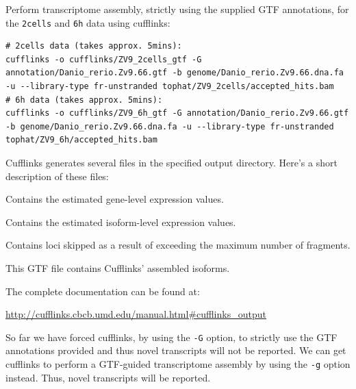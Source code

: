 \begin{steps}
Perform transcriptome assembly, strictly using the supplied GTF annotations, for the \texttt{2cells} and \texttt{6h} data using cufflinks:
\begin{lstlisting}
# 2cells data (takes approx. 5mins):
cufflinks -o cufflinks/ZV9_2cells_gtf -G annotation/Danio_rerio.Zv9.66.gtf -b genome/Danio_rerio.Zv9.66.dna.fa -u --library-type fr-unstranded tophat/ZV9_2cells/accepted_hits.bam
# 6h data (takes approx. 5mins):
cufflinks -o cufflinks/ZV9_6h_gtf -G annotation/Danio_rerio.Zv9.66.gtf -b genome/Danio_rerio.Zv9.66.dna.fa -u --library-type fr-unstranded tophat/ZV9_6h/accepted_hits.bam
\end{lstlisting}
\end{steps}

\begin{information}
Cufflinks generates several files in the specified output directory. Here's a short description of these files:

\begin{description}[style=multiline,labelindent=0cm,align=right,leftmargin=\descriptionlabelspace,rightmargin=1.5cm,font=\ttfamily]
\item[genes.fpkm\_tracking] Contains the estimated gene-level expression values.
\item[isoforms.fpkm\_tracking] Contains the estimated isoform-level expression values.
\item[skipped.gtf] Contains loci skipped as a result of exceeding the maximum number of fragments.
\item[transcripts.gtf] This GTF file contains Cufflinks' assembled isoforms.
\end{description}

The complete documentation can be found at:

\url{http://cufflinks.cbcb.umd.edu/manual.html#cufflinks_output}
\end{information}

\begin{information}
So far we have forced cufflinks, by using the \texttt{-G} option, to strictly
use the GTF annotations provided and thus novel transcripts will not be reported. We
can get cufflinks to perform a GTF-guided transcriptome assembly by using the
\texttt{-g} option instead. Thus, novel transcripts will be reported.

\end{information}

